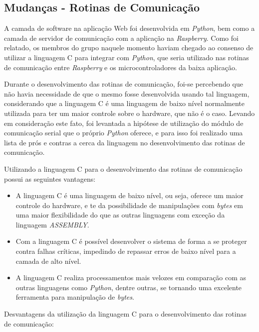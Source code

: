 \subsection*{\textbf{Mudanças - Rotinas de Comunicação}}

A camada de software na aplicação Web foi desenvolvida em \textit{Python}, bem como a camada de servidor de comunicação com a aplicação na \textit{Raspberry}. Como foi relatado, os membros do grupo naquele momento haviam chegado ao consenso de utilizar a linguagem C para integrar com \textit{Python}, que seria utilizado nas rotinas de comunicação entre \textit{Raspberry} e os microcontroladores da baixa aplicação.

Durante o desenvolvimento das rotinas de comunicação, foi-se percebendo que não havia necessidade de que o mesmo fosse desenvolvida usando tal linguagem, considerando que a linguagem C é uma linguagem de baixo nível normalmente utilizada para ter um maior controle sobre o hardware, que não é o caso. Levando em consideração este fato, foi levantada a hipótese de utilização do módulo de comunicação serial que o próprio \textit{Python} oferece, e para isso foi realizado uma lista de prós e contras a cerca da linguagem no desenvolvimento das rotinas de comunicação.

Utilizando a linguagem C para o desenvolvimento das rotinas de comunicação possui as seguintes vantagens:

\begin{itemize}
    \item A linguagem C é uma linguagem de baixo nível, ou seja, oferece um maior controle do hardware, e te da possibilidade de manipulações com \textit{bytes} em uma maior flexibilidade do que as outras linguagens com exceção da linguagem \textit{ASSEMBLY}.
    \item Com a linguagem C é possível desenvolver o sistema de forma a se proteger contra falhas críticas, impedindo de repassar erros de baixo nível para a camada de alto nível.
    \item A linguagem C realiza processamentos mais velozes em comparação com as outras linguagens como \textit{Python}, dentre outras, se tornando uma excelente ferramenta para manipulação de \textit{bytes}.
\end{itemize}

Desvantagens da utilização da linguagem C para o desenvolvimento das rotinas de comunicação:

